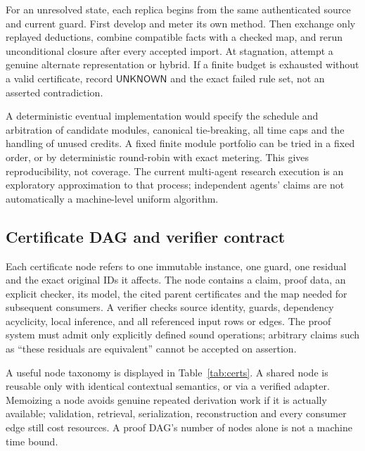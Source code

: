 \documentclass[11pt,letterpaper]{article}
\theoremstyle{definition}
\newcommand{\UNK}{\ensuremath{\mathsf{UNKNOWN}}}
\begin{document}
For an unresolved state, each replica begins from the same authenticated source and current guard. First develop and meter its own method. Then exchange only replayed deductions, combine compatible facts with a checked map, and rerun unconditional closure after every accepted import. At stagnation, attempt a genuine alternate representation or hybrid. If a finite budget is exhausted without a valid certificate, record \(\UNK\) and the exact failed rule set, not an asserted contradiction.

A deterministic eventual implementation would specify the schedule and arbitration of candidate modules, canonical tie-breaking, all time caps and the handling of unused credits. A fixed finite module portfolio can be tried in a fixed order, or by deterministic round-robin with exact metering. This gives reproducibility, not coverage. The current multi-agent research execution is an exploratory approximation to that process; independent agents' claims are not automatically a machine-level uniform algorithm.

\subsection{Certificate DAG and verifier contract}
Each certificate node refers to one immutable instance, one guard, one residual and the exact original IDs it affects. The node contains a claim, proof data, an explicit checker, its model, the cited parent certificates and the map needed for subsequent consumers. A verifier checks source identity, guards, dependency acyclicity, local inference, and all referenced input rows or edges. The proof system must admit only explicitly defined sound operations; arbitrary claims such as ``these residuals are equivalent'' cannot be accepted on assertion.

A useful node taxonomy is displayed in Table~\ref{tab:certs}. A shared node is reusable only with identical contextual semantics, or via a verified adapter. Memoizing a node avoids genuine repeated derivation work if it is actually available; validation, retrieval, serialization, reconstruction and every consumer edge still cost resources. A proof DAG's number of nodes alone is not a machine time bound.
\end{document}

